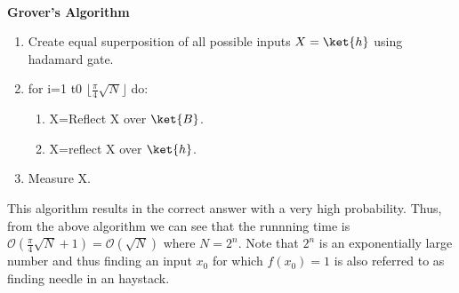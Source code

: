 \documentclass[12pt, oneside]{book}
\theoremstyle{definition}
\theoremstyle{definition}
\theoremstyle{remark}
\begin{document}
\\
\textbf{Grover's Algorithm}
\begin{enumerate}
    \item Create equal superposition of all possible inputs $X=\ket{h}$ using hadamard gate.
    \item for i=1 t0 $\lfloor \frac{\pi}{4}\sqrt{N}\rfloor$ do: \\
    \begin{enumerate}
        \item X=Reflect X over $\ket{B}$.
        \item X=reflect X over $\ket{h}$.
    \end{enumerate}
    \item Measure X.
\end{enumerate}
This algorithm results in the correct answer with a very high probability. Thus, from the above algorithm we can see 
that the runnning time is $\mathcal{O}(\frac{\pi}{4}\sqrt{N}+1)=\mathcal{O}(\sqrt{N})$ where $N=2^n$. Note that $2^n$ is 
an exponentially large number and thus finding an input $x_0$ for which $f(x_0)=1$ is also referred to as finding needle in an haystack.
\end{document}
